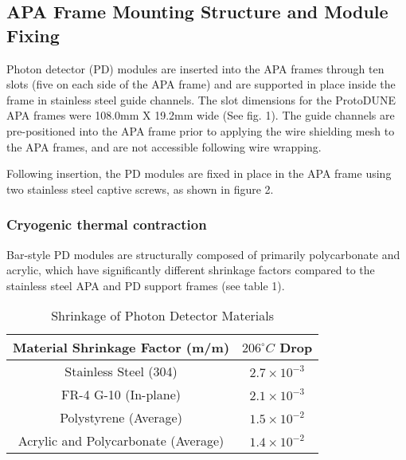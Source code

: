 \subsection{APA Frame Mounting Structure and Module Fixing}	
\label{sec:fdsp-pd-assy-frames}

Photon detector (PD) modules are inserted into the APA frames through ten slots 
(five on each side of the APA frame) and are supported in place inside the frame in 
stainless steel guide channels.  The slot dimensions for the ProtoDUNE APA frames 
were 108.0mm X 19.2mm wide (See fig. 1).  The guide channels are pre-positioned into 
the APA frame prior to applying the wire shielding mesh to the APA frames, and are
not accessible following wire wrapping.


Following insertion, the PD modules are fixed in place in the APA frame using
 two stainless steel captive screws, as shown in figure 2.


\subsubsection{Cryogenic thermal contraction}

Bar-style PD modules are structurally composed of primarily polycarbonate and 
acrylic, which have significantly different shrinkage factors compared to the 
stainless steel APA and PD support frames (see table 1).


\begin{table}[h!]
\label{tbl:fdsfpdshrink}
\begin{center}
\caption{Shrinkage of Photon Detector Materials}
\begin{tabular}{|c|c|}
\hline
\textbf{Material Shrinkage Factor (m/m)} & \textbf{$206^{\circ}C$ Drop}\\
\hline
Stainless Steel (304) & $2.7\times10^{-3}$\\
FR-4 G-10 (In-plane) & $2.1\times10^{-3}$\\
Polystyrene (Average) & $1.5\times10^{-2}$\\
Acrylic and Polycarbonate (Average) & $1.4\times10^{-2}$\\
\hline
\end{tabular}
\end{center}
\end{table}

